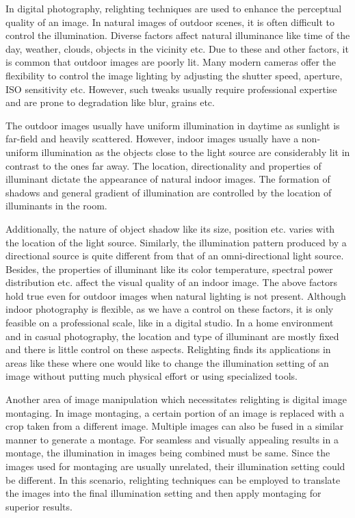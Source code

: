 \documentclass[runningheads]{llncs}
\begin{document}
\par In digital photography, relighting techniques are used to enhance the perceptual quality of an image. In natural images of outdoor scenes, it is often difficult to control the illumination. Diverse factors affect natural illuminance like time of the day, weather, clouds, objects in the vicinity etc. Due to these and other factors, it is common that outdoor images are poorly lit. Many modern cameras offer the flexibility to control the image lighting by adjusting the shutter speed, aperture, ISO sensitivity etc. However, such tweaks usually require professional expertise and are prone to degradation like blur, grains etc. 

\par The outdoor images usually have  uniform illumination in daytime as sunlight is far-field and heavily scattered. However, indoor images usually have a non-uniform illumination as the objects close to the light source are considerably lit in contrast to the ones far away. The location, directionality and properties of illuminant dictate the appearance of natural indoor images. The formation of shadows and general gradient of illumination are controlled by the location of illuminants in the room. 
\par Additionally, the nature of object shadow like its size, position etc. varies with the location of the light source. Similarly, the illumination pattern produced by a directional source is quite different from that of an omni-directional light source. Besides, the properties of illuminant like its color temperature, spectral power distribution etc. affect the visual quality of an indoor image. The above factors hold true even for outdoor images when natural lighting is not present. Although indoor photography is flexible, as we have a control on these factors, it is only feasible on a professional scale, like in a digital studio. In a home environment and in casual photography, the location and type of illuminant are mostly fixed and there is little control on these aspects. Relighting finds its applications in areas like these where one would like to change the illumination setting of an image without putting much physical effort or using specialized tools.

\par Another area of image manipulation which necessitates relighting is digital image montaging. In image montaging, a certain portion of an image is replaced with a crop taken from a different image. Multiple images can also be fused in a similar manner to generate a montage. For seamless and visually appealing results in a montage, the illumination in images being combined must be same. Since the images used for montaging are usually unrelated, their illumination setting could be different. In this scenario, relighting techniques can be employed to translate the images into the final illumination setting and then apply montaging for superior results.
\end{document}
